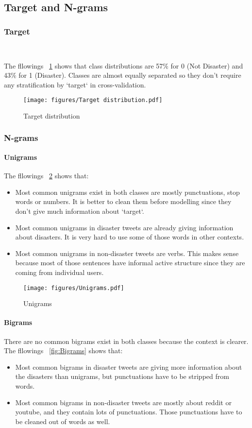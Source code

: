 \subsection{Target and N-grams}
\subsubsection{Target}
\

The fllowings ~\cref{fig:Target-distribution} shows that 
class distributions are 57\% for 0 (Not Disaster) and 43\% for 1 (Disaster). 
Classes are almost equally separated so they don't require any 
stratification by `target` in cross-validation. 


\begin{figure}[htbp]
	\centering
	\texttt{[image: figures/Target distribution.pdf]}
	\caption{Target distribution}
	\label{fig:Target-distribution}
\end{figure}

\subsubsection{N-grams}
\paragraph{Unigrams}
The fllowings ~\cref{fig:Unigrams} shows that:
\begin{itemize}
	\item
	Most common unigrams exist in both classes are mostly punctuations, 
	stop words or numbers. It is better to clean them before modelling 
	since they don't give much information about `target`.
	\item
	Most common unigrams in disaster tweets are already giving 
	information about disasters. It is very hard to use some 
	of those words in other contexts.
	\item
	Most common unigrams in non-disaster tweets are verbs. 
	This makes sense because most of those sentences have informal 
	active structure since they are coming from individual users.
\end{itemize}

\begin{figure}[htbp]
	\centering
	\texttt{[image: figures/Unigrams.pdf]}
	\caption{Unigrams}
	\label{fig:Unigrams}
\end{figure}

\paragraph{Bigrams}
There are no common bigrams exist in both classes  because the context is clearer.
The fllowings ~\cref{fig:Bigrams} shows that:
\begin{itemize}
	\item
	Most common bigrams in disaster tweets are giving more information about 
	the disasters than unigrams, but punctuations have to be stripped from words.
	\item
	Most common bigrams in non-disaster tweets are mostly about reddit or 
	youtube, and they contain lots of punctuations. Those punctuations have to be cleaned out of words as well.
\end{itemize}

